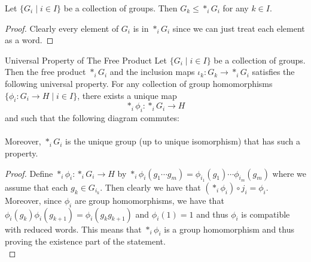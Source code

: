 \documentclass[a4paper]{article}
\begin{document}
\begin{prp}{}{} Let $\{G_i\;|\;i\in I\}$ be a collection of groups. Then $G_k\leq\ast_iG_i$ for any $k\in I$. 
\begin{proof}
Clearly every element of $G_i$ is in $\ast_iG_i$ since we can just treat each element as a word. 
\end{proof}
\end{prp}

\begin{prp}{Universal Property of The Free Product}{} Let $\{G_i\;|\;i\in I\}$ be a collection of groups. Then the free product $\ast_i G_i$ and the inclusion maps $\iota_k:G_k\to\ast_i G_i$ satisfies the following universal property. For any collection of group homomorphisms $\{\phi_i:G_i\to H\;|\;i\in I\}$, there exists a unique map $$\ast_i\phi_i:\ast_i G_i\to H$$ and such that the following diagram commutes: \\
 \\
Moreover, $\ast_i G_i$ is the unique group (up to unique isomorphism) that has such a property. 
\begin{proof}
Define $\ast_i\phi_i:\ast_iG_i\to H$ by $\ast_i\phi_i(g_1\cdots g_m)=\phi_{i_1}(g_1)\cdots\phi_{i_m}(g_m)$ where we assume that each $g_k\in G_{i_k}$. Then clearly we have that $(\ast_i\phi_i)\circ j_i=\phi_i$. Moreover, since $\phi_i$ are group homomorphisms, we have that $\phi_i(g_k)\phi_i(g_{k+1})=\phi_i(g_kg_{k+1})$ and $\phi_i(1)=1$ and thus $\phi_i$ is compatible with reduced words. This means that $\ast_i\phi_i$ is a group homomorphism and thus proving the existence part of the statement. \\


\end{proof}
\end{prp}
\end{document}
